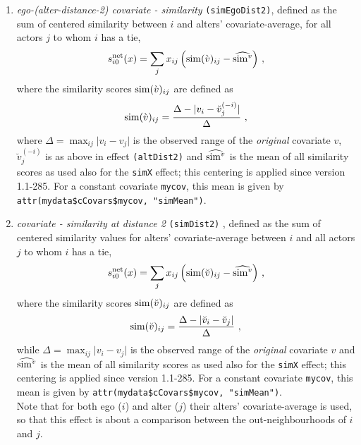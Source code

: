 \documentclass[a4paper,fleqn,11pt]{article}
\newcommand{\+}{\, + \,}
\newcommand{\vit}{\theenumi}
\begin{document}
\begin{enumerate}
\item \emph{ego-(alter-distance-2) covariate - similarity} \texttt{(simEgoDist2)},
      defined as the sum of centered similarity  between $i$
      and alters' covariate-average, for all actors
      $j$ to whom $i$ has a tie,
\[
 s^{\rm net}_{i\vit}(x) = \sum_j x_{ij}\, \Big({\rm sim}(\grave v)_{ij}
  - \widehat{{\rm sim}^v}\Big) \ ,
\]
 where the similarity scores ${\rm sim}(\grave v)_{ij}$ are defined as
\[
{\rm sim}(\grave v)_{ij}=
 \frac{\Delta-\vert  v_i - \breve v_j^{(-i)} \vert}{\Delta} \ ,
\]
  where
 $\Delta=\max_{ij}\vert v_i - v_j \vert$ is the observed range of the
 \emph{original} covariate $v$,
 $\breve v_j^{(-i)}$ is as above in effect \texttt{(altDist2)}
 and $\widehat{{\rm sim}^v}$ is the mean of all similarity scores as used also
 for the \texttt{simX} effect; this centering is applied since version 1.1-285.
 For a constant covariate \texttt{mycov}, this mean is given by
 \texttt{attr(mydata\$cCovars\$mycov, "simMean")}.

\item \emph{covariate - similarity at distance 2} \texttt{(simDist2)} ,
      defined as the sum of centered similarity
      values for alters' covariate-average between $i$ and all actors
      $j$ to whom $i$ has a tie,
\[
 s^{\rm net}_{i\vit}(x) = \sum_j x_{ij} \,\Big({\rm sim}(\breve v)_{ij}
  - \widehat{{\rm sim}^v}\Big) \ ,
\]
 where the similarity scores ${\rm sim}(\breve v)_{ij}$ are defined as
\[
{\rm sim}(\breve v)_{ij}=
 \frac{\Delta-\vert \breve v_i - \breve v_j \vert}{\Delta} \ ,
\]
 while
 $\Delta=\max_{ij}\vert v_i - v_j \vert$ is the observed range of the
 \emph{original} covariate $v$
 and $\widehat{{\rm sim}^v}$ is the mean of all similarity scores as used also
 for the \texttt{simX} effect; this centering is applied since version 1.1-285.
 For a constant covariate \texttt{mycov}, this mean is given by
 \texttt{attr(mydata\$cCovars\$mycov, "simMean")}.\\

  Note that for both ego ($i$) and alter ($j$) their alters' covariate-average
  is used, so that this effect is about a comparison between the
  out-neighbourhoods of $i$ and $j$.



\end{enumerate}
\end{document}
